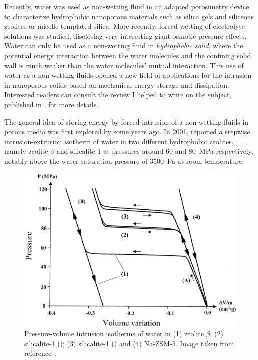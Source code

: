 \documentclass[thesis]{subfiles}
\begin{document}
Recently, water was used as non-wetting fluid in an adapted porosimetry device
to characterize hydrophobic nanoporous materials such as silica
gels\cite{Fadeev1997} and siliceous zeolites\cite{Eroshenko2001, Eroshenko2002}
or micelle-templated silica\cite{Lefevre2004}. More recently, forced wetting of
electrolyte solutions was studied, disclosing very interesting giant osmotic
pressure effects\cite{Liu2009, MichelinJamois2015}. Water can only be used as a
non-wetting fluid in \emph{hydrophobic solid}, where the potential energy
interaction between the water molecules and the confining solid wall is much
weaker than the water molecules' mutual interaction. This use of water as a
non-wetting fluids opened a new field of applications for the intrusion in
nanoporous solids based on mechanical energy storage and
dissipation\cite{Eroshenko2001, Fraux2017-2}. Interested readers can consult the
review I helped to write on the subject, published in
\cite{Fraux2017-2}, for more details.

The general idea of storing energy by forced intrusion of a non-wetting fluids
in porous media was first explored by \citeauthor{Fadeev1997} some years
ago\cite{Fadeev1997}. In 2001, \citeauthor{Eroshenko2001}\cite{Eroshenko2001}
reported a stepwise intrusion-extrusion isotherm of water in two different
hydrophobic zeolites, namely zeolite $\beta$ and silicalite-1 at pressures
around 60 and \SI{80}{MPa} respectively, \ie notably above the water saturation
pressure of \SI{3 500}{Pa} at room temperature.

\begin{figure}[ht]
    \centering
    \includegraphics[width=0.75\linewidth]{figures/cited/intrusion-zeosil}
    \caption{Pressure-volume intrusion isotherms of water in (1) zeolite
    $\beta$; (2) silicalite-1 (); (3) silicalite-1 () and (4)
    Na-ZSM-5. Image taken from reference~\cite{Eroshenko2001}.}
    \label{fig:intrusion-zeosil}
\end{figure}
\end{document}
